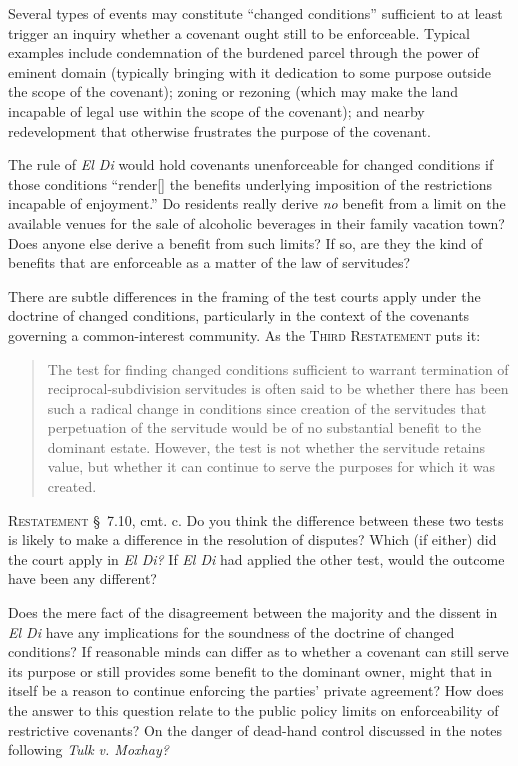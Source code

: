 
\item Several types of events may constitute ``changed conditions'' sufficient
to at least trigger an inquiry whether a covenant ought still to be enforceable.
Typical examples include condemnation of the burdened parcel through the power
of eminent domain (typically bringing with it dedication to some purpose outside
the scope of the covenant); zoning or rezoning (which may make the land
incapable of legal use within the scope of the covenant); and nearby
redevelopment that otherwise frustrates the purpose of the covenant.

\item The rule of \textit{El Di} would hold covenants unenforceable for changed
conditions if those conditions ``render[] the benefits underlying imposition of
the restrictions incapable of enjoyment.'' Do residents really derive
\textit{no} benefit from a limit on the available venues for the sale of
alcoholic beverages in their family vacation town? Does anyone else derive a
benefit from such limits? If so, are they the kind of benefits that are
enforceable as a matter of the law of servitudes?

\item There are subtle differences in the framing of the test courts apply under
the doctrine of changed conditions, particularly in the context of the covenants
governing a common-interest community. As the \textsc{Third Restatement} puts
it:
\begin{quote}
The test for finding changed conditions sufficient to warrant termination of
reciprocal-subdivision servitudes is often said to be whether there has been
such a radical change in conditions since creation of the servitudes that
perpetuation of the servitude would be of no substantial benefit to the dominant
estate. However, the test is not whether the servitude retains value, but
whether it can continue to serve the purposes for which it was created.
\end{quote}
\textsc{Restatement} \S~7.10, cmt. c. Do you think the difference between these
two tests
is likely to make a difference in the resolution of disputes? Which (if either)
did the court apply in \textit{El Di?} If \textit{El Di} had applied the other
test, would the outcome have been any different?


\item Does the mere fact of the disagreement between the majority and the
dissent in \textit{El Di} have any implications for the soundness of the
doctrine of changed conditions? If reasonable minds can differ as to whether a
covenant can still serve its purpose or still provides some benefit to the
dominant owner, might that in itself be a reason to continue enforcing the
parties' private agreement? How does the answer to this question relate to the
public policy limits on enforceability of restrictive covenants? On the danger
of dead-hand control discussed in the notes following \textit{Tulk v. Moxhay?}

